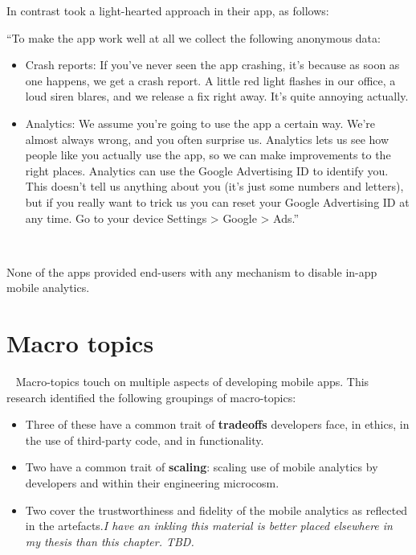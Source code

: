 In contrast  took a light-hearted approach in their app, as follows: 

\begin{kaobox}[frametitle=Moodspace privacy policy]
``To make the app work well at all we collect the following anonymous data:
\begin{itemize}
    \item Crash reports: If you've never seen the app crashing, it's because as soon as one happens, we get a crash report. A little red light flashes in our office, a loud siren blares, and we release a fix right away. It's quite annoying actually.
    \item Analytics: We assume you're going to use the app a certain way. We're almost always wrong, and you often surprise us. Analytics lets us see how people like you actually use the app, so we can make improvements to the right places. Analytics can use the Google Advertising ID to identify you. This doesn't tell us anything about you (it's just some numbers and letters), but if you really want to trick us you can reset your Google Advertising ID at any time. Go to your device Settings > Google > Ads.''
\end{itemize}~
\end{kaobox}

None of the apps provided end-users with any mechanism to disable in-app mobile analytics.

\section{Macro topics}~\label{aata-macro-topics}
Macro-topics touch on multiple aspects of developing mobile apps. This research identified the following groupings of macro-topics:

\begin{itemize}
    \item Three of these have a common trait of \textbf{tradeoffs} developers face, in ethics, in the use of third-party code, and in functionality.
    \item Two have a common trait of \textbf{scaling}: scaling use of mobile analytics by developers and within their engineering microcosm.
    \item Two cover the trustworthiness and fidelity of the mobile analytics as reflected in the artefacts.\emph{I have an inkling this material is better placed elsewhere in my thesis than this chapter. TBD.} 
\end{itemize}

